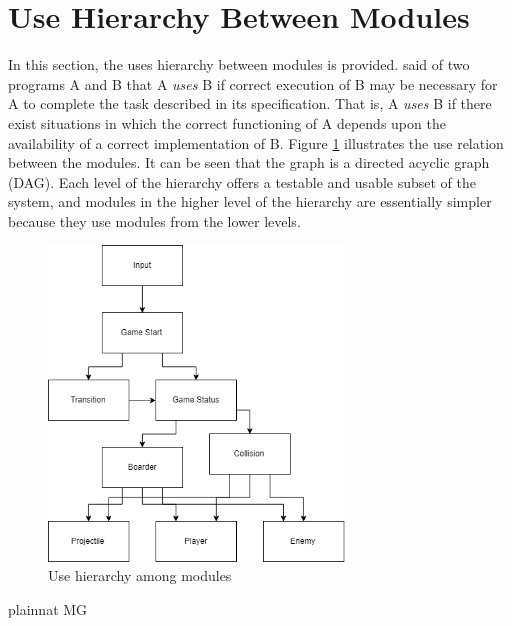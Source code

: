 \documentclass[12pt, titlepage]{article}
\begin{document}
\section{Use Hierarchy Between Modules} \label{SecUse}

In this section, the uses hierarchy between modules is
provided. \citet{Parnas1978} said of two programs A and B that A {\em uses} B if
correct execution of B may be necessary for A to complete the task described in
its specification. That is, A {\em uses} B if there exist situations in which
the correct functioning of A depends upon the availability of a correct
implementation of B.  Figure \ref{FigUH} illustrates the use relation between
the modules. It can be seen that the graph is a directed acyclic graph
(DAG). Each level of the hierarchy offers a testable and usable subset of the
system, and modules in the higher level of the hierarchy are essentially simpler
because they use modules from the lower levels.

\begin{figure}[H]
\centering
\includegraphics[width=0.7\textwidth]{Hierarchy.png}
\caption{Use hierarchy among modules}
\label{FigUH}
\end{figure}


 {plainnat}
 {MG}
\end{document}
